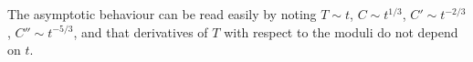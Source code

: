 The asymptotic behaviour can be read easily by noting $T \sim t$, $C \sim t^{1/3}$, $C' \sim t^{-2/3}$, $C'' \sim t^{-5/3}$, and that derivatives of $T$ with respect to the moduli do not depend on $t$.

%
%
%
%
%
%
%
%
%
%

%

